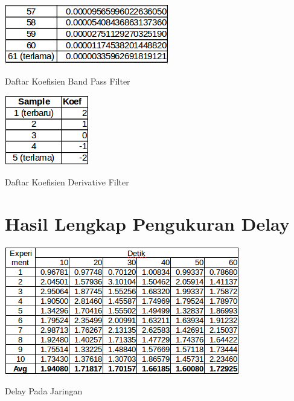 \begin{table}[H]
	\includegraphics[scale=0.6]{images/koef3.png}
	\caption{Daftar Koefisien Band Pass Filter}
\end{table}
\begin{table}[H]
	\centering
	\includegraphics[scale=0.8]{images/koef4.png}
	\caption{Daftar Koefisien Derivative Filter}
\end{table}

\section{Hasil Lengkap Pengukuran Delay}\label{lampiran:delay}
\begin{table}[H]
	\centering
	\includegraphics[scale=0.8]{images/delay_full.png}
	\caption{Delay Pada Jaringan}
\end{table}

